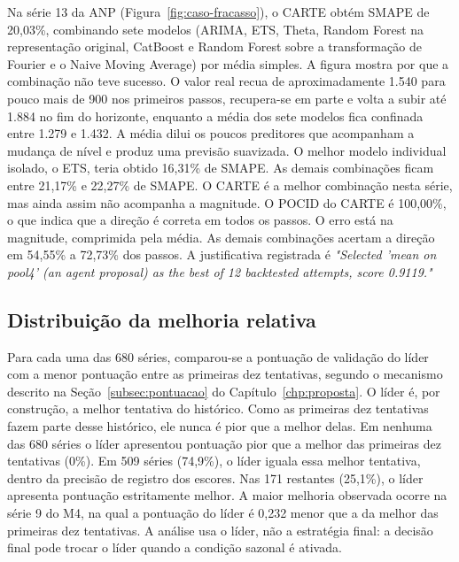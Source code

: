 Na série 13 da ANP (Figura~\ref{fig:caso-fracasso}), o CARTE obtém SMAPE de 20,03\%, combinando sete modelos (ARIMA, ETS, Theta, Random Forest na representação original, CatBoost e Random Forest sobre a transformação de Fourier e o Naive Moving Average) por média simples. A figura mostra por que a combinação não teve sucesso. O valor real recua de aproximadamente 1.540 para pouco mais de 900 nos primeiros passos, recupera-se em parte e volta a subir até 1.884 no fim do horizonte, enquanto a média dos sete modelos fica confinada entre 1.279 e 1.432. A média dilui os poucos preditores que acompanham a mudança de nível e produz uma previsão suavizada. O melhor modelo individual isolado, o ETS, teria obtido 16,31\% de SMAPE. As demais combinações ficam entre 21,17\% e 22,27\% de SMAPE. O CARTE é a melhor combinação nesta série, mas ainda assim não acompanha a magnitude. O POCID do CARTE é 100,00\%, o que indica que a direção é correta em todos os passos. O erro está na magnitude, comprimida pela média. As demais combinações acertam a direção em 54,55\% a 72,73\% dos passos. A justificativa registrada é \textit{"Selected 'mean on pool4' (an agent proposal) as the best of 12 backtested attempts, score 0.9119."}
\subsection{Distribuição da melhoria relativa}

Para cada uma das 680 séries, comparou-se a pontuação de validação do líder com a menor pontuação entre as primeiras dez tentativas, segundo o mecanismo descrito na Seção~\ref{subsec:pontuacao} do Capítulo~\ref{chp:proposta}. O líder é, por construção, a melhor tentativa do histórico. Como as primeiras dez tentativas fazem parte desse histórico, ele nunca é pior que a melhor delas. Em nenhuma das 680 séries o líder apresentou pontuação pior que a melhor das primeiras dez tentativas (0\%). Em 509 séries (74,9\%), o líder iguala essa melhor tentativa, dentro da precisão de registro dos escores. Nas 171 restantes (25,1\%), o líder apresenta pontuação estritamente melhor. A maior melhoria observada ocorre na série 9 do M4, na qual a pontuação do líder é 0,232 menor que a da melhor das primeiras dez tentativas. A análise usa o líder, não a estratégia final: a decisão final pode trocar o líder quando a condição sazonal é ativada.

